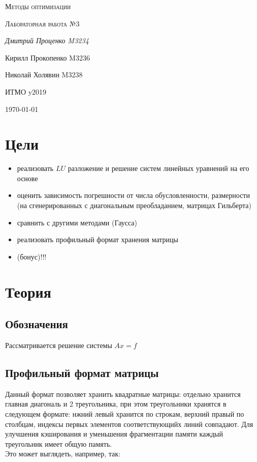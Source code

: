 \documentclass[russian, english]{article}
\begin{document}
\begin{titlepage}
\centering
	{\scshape\LARGE Методы оптимизации \par}
	\vspace{1cm}
	{\scshape\Large Лабораторная работа №3\par}
	\vspace{2cm}
	{\Large\itshape Дмитрий Проценко M3234 \par
	Кирилл Прокопенко M3236 \par
	Николай Холявин M3238 \par}
	\vfill
	ИТМО y2019
	\vfill
	{\large \today\par}
\end{titlepage}

\tableofcontents
\newpage

\section{Цели}
\begin{itemize}
	\item реализовать $LU$ разложение и решение систем линейных уравнений на его основе
	\item оценить зависимость погрешности от числа обусловленности, размерности (на сгенерированных с диагональным преобладанием, матрицах Гильберта)
	\item сравнить с другими методами (Гаусса)
	\item реализовать профильный формат хранения матрицы
	\item (бонус)!!!
\end{itemize}
\section{Теория}
\subsection{Обозначения}
Рассматривается решение системы $Ax=f$
\subsection{Профильный формат матрицы}
Данный формат позволяет хранить квадратные матрицы: отдельно хранится главная диагональ и 2 треугольника, при этом треугольники хранятся в следующем формате: нжний левый хранится по строкам, верхний правый по столбцам, индексы первых элементов соответствующийх линий совпадают. Для улучшения кэширования и уменьшения фрагментации памяти каждый треугольник имеет общую память.\\
Это может выглядеть, например, так:
\end{document}
